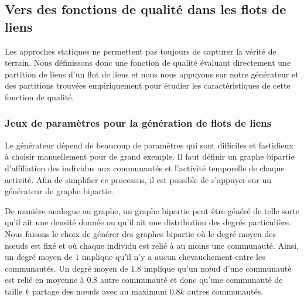 
\subsection{Vers des fonctions de qualité dans les flots de liens}
\label{sec:versqualite_qualite}

Les approches statiques ne permettent pas toujours de capturer la vérité de terrain.
Nous définissons donc une fonction de qualité évaluant directement une partition de liens d'un flot de liens et nous nous appuyons sur notre générateur et des partitions trouvées empiriquement pour étudier les caractéristiques de cette fonction de qualité.





\subsubsection{Jeux de paramètres pour la génération de flots de liens}
\label{subsec:versqualite_qualite_param}
Le générateur dépend de beaucoup de paramètres qui sont difficiles et fastidieux à choisir manuellement pour de grand exemple.
Il faut définir un graphe bipartie d'affiliation des individus aux communautés et l'activité temporelle de chaque activité.
Afin de simplifier ce processus, il est possible de s'appuyer sur un générateur de graphe bipartie.

De manière analogue au graphe, un graphe bipartie peut être généré de telle sorte qu'il ait une densité donnée ou qu'il ait une distribution des degrés particulière.
Nous faisons le choix de générer des graphes bipartie où le degré moyen des n\oe uds est fixé et où chaque individu est relié à au moins une communauté.
Ainsi, un degré moyen de $1$ implique qu'il n'y a aucun chevauchement entre les communautés.
Un degré moyen de $1.8$ implique qu'un n\oe ud d'une communauté est relié en moyenne à $0.8$ autre communauté et donc qu'une communauté de taille $k$ partage des n\oe uds avec au maximum $0.8k$ autres communautés.

